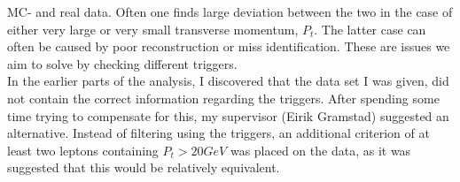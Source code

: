\ac{MC}- and real data. Often one finds large deviation between the two in the case
of either very large or very small transverse momentum, $P_t$. The latter case can often be caused by 
poor reconstruction or miss identification. These are issues we aim to solve by checking
different triggers. 
\\
In the earlier parts of the analysis, I discovered that the data set I was given, did not contain the correct information 
regarding the triggers. After spending some time trying to compensate for this, my supervisor (Eirik Gramstad) suggested an alternative.
Instead of filtering using the triggers, an additional criterion of at least two leptons containing $P_t>20GeV$ was placed on the data,
as it was suggested that this would be relatively equivalent.

